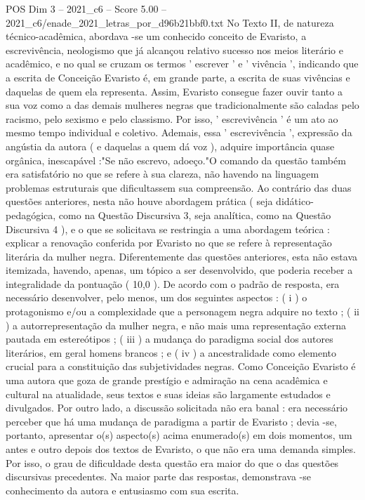 \begin{textsample}{POS Dim 3 – 2021\_c6 – Score 5.00 – 2021\_c6/enade\_2021\_letras\_por\_d96b21bbf0.txt}
No Texto II, de natureza técnico-acadêmica, abordava -se um conhecido conceito de Evaristo, a escrevivência, neologismo que já alcançou relativo sucesso nos meios literário e acadêmico, e no qual se cruzam os termos ' escrever ' e ' vivência ', indicando que a escrita de Conceição Evaristo é, em grande parte, a escrita de suas vivências e daquelas de quem ela representa.
Assim, Evaristo consegue fazer ouvir tanto a sua voz como a das demais mulheres negras que tradicionalmente são caladas pelo racismo, pelo sexismo e pelo classismo.
Por isso, ' escrevivência ' é um ato ao mesmo tempo individual e coletivo.
Ademais, essa ' escrevivência ', expressão da angústia da autora ( e daquelas a quem dá voz ), adquire importância quase orgânica, inescapável :"Se não escrevo, adoeço."O comando da questão também era satisfatório no que se refere à sua clareza, não havendo na linguagem problemas estruturais que dificultassem sua compreensão.
Ao contrário das duas questões anteriores, nesta não houve abordagem prática ( seja didático-pedagógica, como na Questão Discursiva 3, seja analítica, como na Questão Discursiva 4 ), e o que se solicitava se restringia a uma abordagem teórica : explicar a renovação conferida por Evaristo no que se refere à representação literária da mulher negra.
Diferentemente das questões anteriores, esta não estava itemizada, havendo, apenas, um tópico a ser desenvolvido, que poderia receber a integralidade da pontuação ( 10,0 ).
De acordo com o padrão de resposta, era necessário desenvolver, pelo menos, um dos seguintes aspectos : ( i ) o protagonismo e/ou a complexidade que a personagem negra adquire no texto ; ( ii ) a autorrepresentação da mulher negra, e não mais uma representação externa pautada em estereótipos ; ( iii ) a mudança do paradigma social dos autores literários, em geral homens brancos ; e ( iv ) a ancestralidade como elemento crucial para a constituição das subjetividades negras.
Como Conceição Evaristo é uma autora que goza de grande prestígio e admiração na cena acadêmica e cultural na atualidade, seus textos e suas ideias são largamente estudados e divulgados.
Por outro lado, a discussão solicitada não era banal : era necessário perceber que há uma mudança de paradigma a partir de Evaristo ; devia -se, portanto, apresentar o(s) aspecto(s) acima enumerado(s) em dois momentos, um antes e outro depois dos textos de Evaristo, o que não era uma demanda simples.
Por isso, o grau de dificuldade desta questão era maior do que o das questões discursivas precedentes.
Na maior parte das respostas, demonstrava -se conhecimento da autora e entusiasmo com sua escrita.

\end{textsample}
